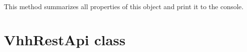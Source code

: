 \documentclass[letterpaper,10pt,english,openany,oneside]{sphinxmanual}
\begin{document}
\begin{fulllineitems}
\begin{fulllineitems}
\begin{quote}
\begin{description}
\end{description}\end{quote}

\end{fulllineitems}


\begin{fulllineitems}
\label{\detokenize{Video:Video.Video.printInfo}}
This method summarizes all properties of this object and print it to the console.

\end{fulllineitems}


\end{fulllineitems}



\section{VhhRestApi class}
\label{\detokenize{VhhRestApi:vhhrestapi-class}}\label{\detokenize{VhhRestApi::doc}}
\end{document}
